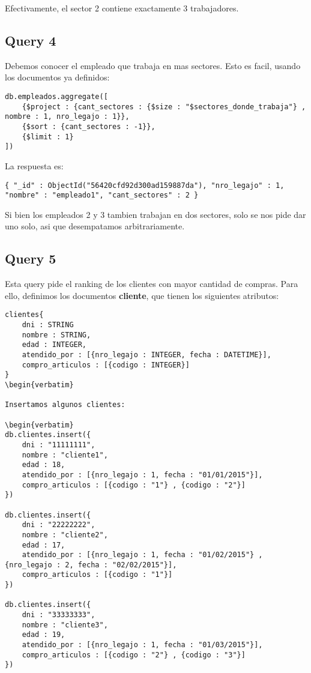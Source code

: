Efectivamente, el sector 2 contiene exactamente 3 trabajadores.

\subsection{Query 4}
Debemos conocer el empleado que trabaja en mas sectores. Esto es facil, usando los documentos ya definidos:

\begin{verbatim}
db.empleados.aggregate([
	{$project : {cant_sectores : {$size : "$sectores_donde_trabaja"} , nombre : 1, nro_legajo : 1}},
	{$sort : {cant_sectores : -1}},
	{$limit : 1}
])
\end{verbatim}

La respuesta es:

\begin{verbatim}
{ "_id" : ObjectId("56420cfd92d300ad159887da"), "nro_legajo" : 1, "nombre" : "empleado1", "cant_sectores" : 2 }
\end{verbatim}

Si bien los empleados 2 y 3 tambien trabajan en dos sectores, solo se nos pide dar uno solo, asi que desempatamos arbitrariamente.

\subsection{Query 5}
Esta query pide el ranking de los clientes con mayor cantidad de compras. Para ello, definimos los documentos \textbf{cliente}, que tienen los siguientes atributos:

\begin{verbatim}
clientes{
	dni : STRING
	nombre : STRING,
	edad : INTEGER,
	atendido_por : [{nro_legajo : INTEGER, fecha : DATETIME}],
	compro_articulos : [{codigo : INTEGER}]
}
\begin{verbatim}

Insertamos algunos clientes:

\begin{verbatim}
db.clientes.insert({
	dni : "11111111",
	nombre : "cliente1",
	edad : 18,
	atendido_por : [{nro_legajo : 1, fecha : "01/01/2015"}],
	compro_articulos : [{codigo : "1"} , {codigo : "2"}]
})

db.clientes.insert({
	dni : "22222222",
	nombre : "cliente2",
	edad : 17,
	atendido_por : [{nro_legajo : 1, fecha : "01/02/2015"} , {nro_legajo : 2, fecha : "02/02/2015"}],
	compro_articulos : [{codigo : "1"}]
})

db.clientes.insert({
	dni : "33333333",
	nombre : "cliente3",
	edad : 19,
	atendido_por : [{nro_legajo : 1, fecha : "01/03/2015"}],
	compro_articulos : [{codigo : "2"} , {codigo : "3"}]
})
\end{verbatim}

